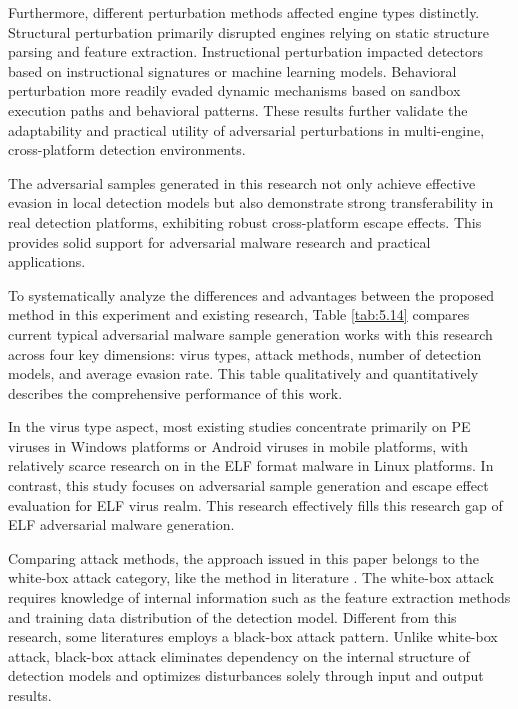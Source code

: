 \begin{conclusion}
Furthermore, different perturbation methods affected engine types distinctly. Structural perturbation primarily disrupted engines relying on static structure parsing and feature extraction. Instructional perturbation impacted detectors based on instructional signatures or machine learning models. Behavioral perturbation more readily evaded dynamic mechanisms based on sandbox execution paths and behavioral patterns. These results further validate the adaptability and practical utility of adversarial perturbations in multi-engine, cross-platform detection environments.

The adversarial samples generated in this research not only achieve effective evasion in local detection models but also demonstrate strong transferability in real detection platforms, exhibiting robust cross-platform escape effects. This provides solid support for adversarial malware research and practical applications.

To systematically analyze the differences and advantages between the proposed method in this experiment and existing research, Table \ref{tab:5.14} compares current typical adversarial malware sample generation works with this research across four key dimensions: virus types, attack methods, number of detection models, and average evasion rate. This table qualitatively and quantitatively describes the comprehensive performance of this work.

In the virus type aspect, most existing studies concentrate primarily on PE viruses in Windows platforms or Android viruses in mobile platforms, with relatively scarce research on in the ELF format malware in Linux platforms. In contrast, this study focuses on adversarial sample generation and escape effect evaluation for ELF virus realm. This research effectively fills this research gap of ELF adversarial malware generation.

Comparing attack methods, the approach issued in this paper belongs to the white-box attack category, like the method in literature \cite{rathore2021identification}. The white-box attack requires knowledge of internal information such as the feature extraction methods and training data distribution of the detection model. Different from this research, some literatures \cite{kolosnjaji2018adversarial,quertier2022merlin,song2022mab} employs a black-box attack pattern. Unlike white-box attack, black-box attack eliminates dependency on the internal structure of detection models and optimizes disturbances solely through input and output results.


\end{conclusion}
